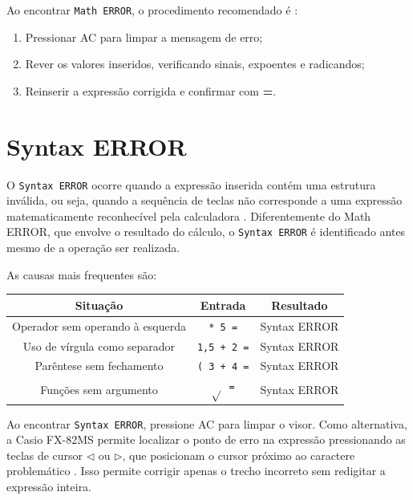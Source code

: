 Ao encontrar \texttt{Math ERROR}, o procedimento recomendado é \cite{casio2004}:

\begin{enumerate}
    \item Pressionar AC para limpar a mensagem de erro;
    \item Rever os valores inseridos, verificando sinais, expoentes e
    radicandos;
    \item Reinserir a expressão corrigida e confirmar com \textbf{=}.
\end{enumerate}

\section{Syntax ERROR}

O \texttt{Syntax ERROR} ocorre quando a expressão inserida contém uma estrutura inválida, ou seja, quando a sequência de teclas não corresponde a uma expressão matematicamente reconhecível pela calculadora \cite{casio2004}. Diferentemente do Math ERROR, que envolve o resultado do cálculo, o \texttt{Syntax ERROR} é identificado antes mesmo de a operação ser realizada.

As causas mais frequentes são:

\begin{table}[H]
    \centering
    \begin{tabular}{|c|c|c|}
        \hline
        \textbf{Situação} & \textbf{Entrada} & \textbf{Resultado} \\ \hline
        Operador sem operando à esquerda & \texttt{* 5 =} & Syntax ERROR \\
        Uso de vírgula como separador & \texttt{1,5 + 2 =} & Syntax ERROR \\
        Parêntese sem fechamento & \texttt{( 3 + 4 =} & Syntax ERROR \\
        Funções sem argumento & \texttt{$\sqrt{}$ =} & Syntax ERROR \\ \hline
    \end{tabular}
\end{table}

Ao encontrar \texttt{Syntax ERROR}, pressione AC para limpar o visor. Como alternativa, a Casio FX-82MS permite localizar o ponto de erro na expressão pressionando as teclas de cursor $\triangleleft$ ou $\triangleright$, que posicionam o cursor próximo ao caractere problemático \cite{casio2004}. Isso permite corrigir apenas o trecho incorreto sem redigitar a expressão inteira.

